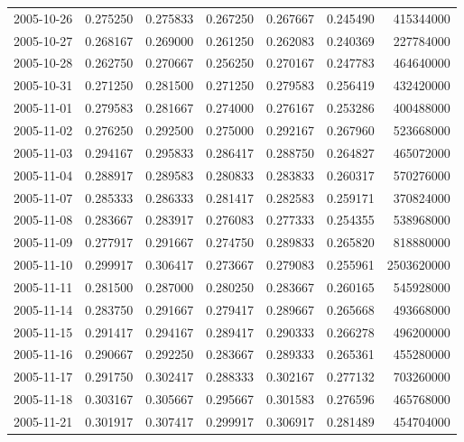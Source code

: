 \begin{tabular}{lrrrrrr}
2005-10-26 &    0.275250 &    0.275833 &    0.267250 &    0.267667 &    0.245490 &   415344000 \\
2005-10-27 &    0.268167 &    0.269000 &    0.261250 &    0.262083 &    0.240369 &   227784000 \\
2005-10-28 &    0.262750 &    0.270667 &    0.256250 &    0.270167 &    0.247783 &   464640000 \\
2005-10-31 &    0.271250 &    0.281500 &    0.271250 &    0.279583 &    0.256419 &   432420000 \\
2005-11-01 &    0.279583 &    0.281667 &    0.274000 &    0.276167 &    0.253286 &   400488000 \\
2005-11-02 &    0.276250 &    0.292500 &    0.275000 &    0.292167 &    0.267960 &   523668000 \\
2005-11-03 &    0.294167 &    0.295833 &    0.286417 &    0.288750 &    0.264827 &   465072000 \\
2005-11-04 &    0.288917 &    0.289583 &    0.280833 &    0.283833 &    0.260317 &   570276000 \\
2005-11-07 &    0.285333 &    0.286333 &    0.281417 &    0.282583 &    0.259171 &   370824000 \\
2005-11-08 &    0.283667 &    0.283917 &    0.276083 &    0.277333 &    0.254355 &   538968000 \\
2005-11-09 &    0.277917 &    0.291667 &    0.274750 &    0.289833 &    0.265820 &   818880000 \\
2005-11-10 &    0.299917 &    0.306417 &    0.273667 &    0.279083 &    0.255961 &  2503620000 \\
2005-11-11 &    0.281500 &    0.287000 &    0.280250 &    0.283667 &    0.260165 &   545928000 \\
2005-11-14 &    0.283750 &    0.291667 &    0.279417 &    0.289667 &    0.265668 &   493668000 \\
2005-11-15 &    0.291417 &    0.294167 &    0.289417 &    0.290333 &    0.266278 &   496200000 \\
2005-11-16 &    0.290667 &    0.292250 &    0.283667 &    0.289333 &    0.265361 &   455280000 \\
2005-11-17 &    0.291750 &    0.302417 &    0.288333 &    0.302167 &    0.277132 &   703260000 \\
2005-11-18 &    0.303167 &    0.305667 &    0.295667 &    0.301583 &    0.276596 &   465768000 \\
2005-11-21 &    0.301917 &    0.307417 &    0.299917 &    0.306917 &    0.281489 &   454704000 \\

\end{tabular}

